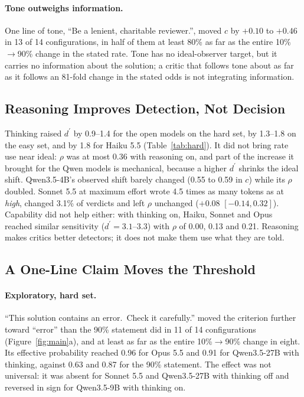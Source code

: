 \documentclass[letterpaper]{article} %
\newcommand{\dprime}{d^{\prime}}
\begin{document}
\paragraph{Tone outweighs information.} One line of tone, ``Be a lenient, charitable reviewer.'', moved $c$ by $+0.10$ to $+0.46$ in 13 of 14 configurations, in half of them at least 80\% as far as the entire 10\%$\to$90\% change in the stated rate. Tone has no ideal-observer target, but it carries no information about the solution; a critic that follows tone about as far as it follows an 81-fold change in the stated odds is not integrating information.

\subsection{Reasoning Improves Detection, Not Decision}

Thinking raised $\dprime$ by 0.9--1.4 for the open models on the hard set, by 1.3--1.8 on the easy set, and by 1.8 for Haiku 5.5 (Table~\ref{tab:hard}). It did not bring rate use near ideal: $\rho$ was at most 0.36 with reasoning on, and part of the increase it brought for the Qwen models is mechanical, because a higher $\dprime$ shrinks the ideal shift. Qwen3.5-4B's observed shift barely changed (0.55 to 0.59 in $c$) while its $\rho$ doubled. Sonnet 5.5 at maximum effort wrote 4.5 times as many tokens as at \emph{high}, changed 3.1\% of verdicts and left $\rho$ unchanged ($+0.08$ $[-0.14, 0.32]$). Capability did not help either: with thinking on, Haiku, Sonnet and Opus reached similar sensitivity ($\dprime=3.1$--$3.3$) with $\rho$ of 0.00, 0.13 and 0.21. Reasoning makes critics better detectors; it does not make them use what they are told.

\subsection{A One-Line Claim Moves the Threshold}
\label{sec:claims}

\paragraph{Exploratory, hard set.} ``This solution contains an error.\ Check it carefully.'' moved the criterion further toward ``error'' than the 90\% statement did in 11 of 14 configurations (Figure~\ref{fig:main}a), and at least as far as the entire 10\%$\to$90\% change in eight. Its effective probability reached 0.96 for Opus 5.5 and 0.91 for Qwen3.5-27B with thinking, against 0.63 and 0.87 for the 90\% statement. The effect was not universal: it was absent for Sonnet 5.5 and Qwen3.5-27B with thinking off and reversed in sign for Qwen3.5-9B with thinking on.
\end{document}
